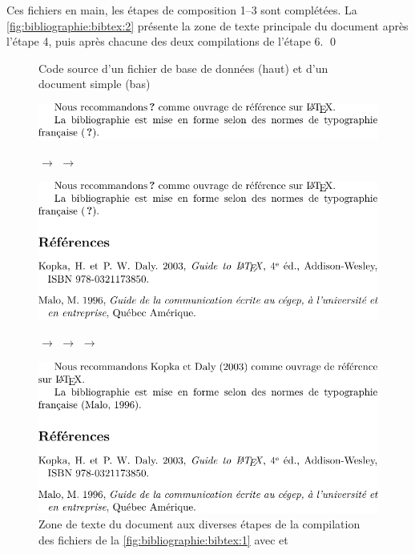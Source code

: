 \begin{exemple}
  Ces fichiers en main, les étapes de composition 1--3 sont
  complétées. La \autoref{fig:bibliographie:bibtex:2} présente la zone
  de texte principale du document après l'étape 4, puis après chacune
  des deux compilations de l'étape 6. %
  \qed
  \begin{figure}
    \centering
    
    \medskip
    
    \caption{Code source d'un fichier de base de données (haut) et
      d'un document simple (bas)}
    \label{fig:bibliographie:bibtex:1}
  \end{figure}
  \begin{figure}
    \begin{framed}
      \includegraphics[width=\linewidth]{exemple-bibliographie-cropped-1}
    \end{framed}
     $\rightarrow$  $\rightarrow$ 
    \begin{framed}
      \includegraphics[width=\linewidth]{exemple-bibliographie-cropped-2}
    \end{framed}
     $\rightarrow$  $\rightarrow$  $\rightarrow$ 
    \begin{framed}
      \includegraphics[width=\linewidth]{exemple-bibliographie-cropped-3}
    \end{framed}
    \caption{Zone de texte du document aux diverses étapes de la
      compilation des fichiers de la
      \autoref{fig:bibliographie:bibtex:1} avec {\XeLaTeX} et
      {\BibTeX}}
    \label{fig:bibliographie:bibtex:2}
  \end{figure}
\end{exemple}


